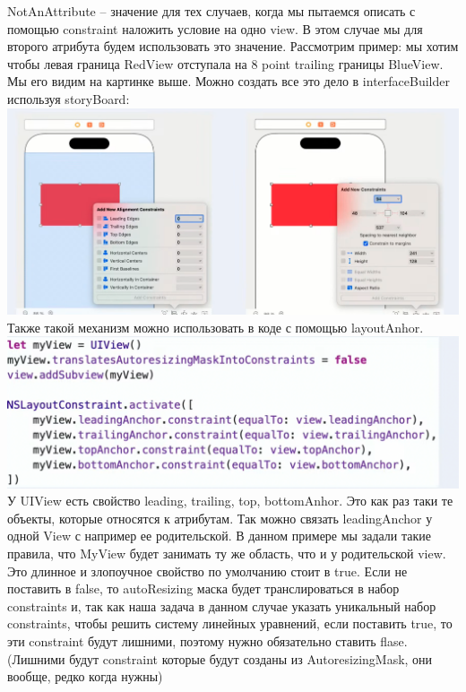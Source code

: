 \documentclass{article}
\begin{document}
    NotAnAttribute -- значение для тех случаев, когда мы пытаемся описать с помощью constraint наложить условие на одно view. В этом случае мы для второго атрибута будем использовать это значение. 
    \newline
    Рассмотрим пример: мы хотим чтобы левая граница RedView отступала на 8 point trailing границы BlueView.  Мы его видим на картинке выше. 
    \newline
    Можно создать все это дело в interfaceBuilder используя storyBoard:
    \newline
    \includegraphics[scale = 0.2]{pic/Снимок экрана 2023-07-31 в 21.49.33.png}
    \newline
    Также такой механизм можно использовать в коде с помощью layoutAnhor. 
    \newline
    \includegraphics[scale = 0.3]{pic/Снимок экрана 2023-07-31 в 21.50.46.png}
    \newline
    У UIView есть свойство leading, trailing, top, bottomAnhor. Это как раз таки те объекты, которые относятся к атрибутам. Так можно связать leadingAnchor у одной View с например ее родительской. 
    \newline
    В данном примере мы задали такие правила, что MyView будет занимать ту же область, что и у родительской view.
    \newline
    Это длинное и злопоучное свойство  по умолчанию стоит в true. Если не поставить в false, то autoResizing маска будет транслироваться в набор constraints и, так как наша задача в данном случае указать уникальный набор constraints, чтобы решить систему линейных уравнений, если поставить true, то эти constraint будут лишними, поэтому нужно обязательно ставить flase.(Лишними будут constraint которые будут созданы из AutoresizingMask, они вообще, редко когда нужны)
\end{document}
